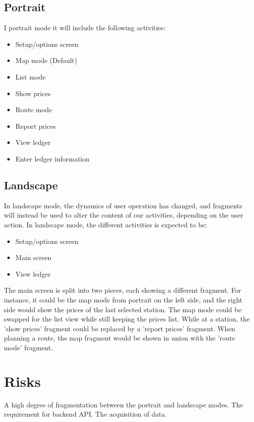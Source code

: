 \subsection{Portrait}
I portrait mode it will include the following activities:
\begin{itemize}
	\item Setup/options screen
	\item Map mode (Default)
	\item List mode
	\item Show prices
	\item Route mode
	\item Report prices
	\item View ledger
	\item Enter ledger information
\end{itemize}

\subsection{Landscape}
In landscape mode, the dynamics of user operation has changed, and fragments will instead be used to alter the content of our activities, depending on the user action. In landscape mode, the different activities is expected to be:
\begin{itemize}
	\item Setup/options screen
	\item Main screen
	\item View ledger
\end{itemize}

The main screen is split into two pieces, each showing a different fragment. For instance, it could be the map mode from portrait on the left side, and the right side would show the prices of the last selected station. The map mode could be swapped for the list view while still keeping the prices list. While at a station, the 'show prices' fragment could be replaced by a 'report prices' fragment. When planning a route, the map fragment would be shown in union with the 'route mode' fragment.

\section{Risks}
A high degree of fragmentation between the portrait and landscape modes.
The requirement for backend API.
The acquisition of data.